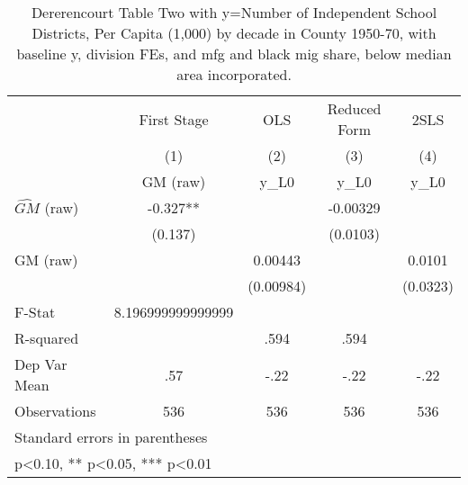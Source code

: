 \begin{table}[htbp]\centering
\def\sym#1{\ifmmode^{#1}\else\(^{#1}\)\fi}
\caption{Dererencourt Table Two with y=Number of Independent School Districts, Per Capita (1,000) by decade in County 1950-70, with baseline y, division FEs, and mfg and black mig share, below median area incorporated.}
\begin{tabular}{l*{4}{c}}
\toprule
                    & First Stage   &         OLS   &Reduced Form   &        2SLS   \\
                    &\multicolumn{1}{c}{(1)}&\multicolumn{1}{c}{(2)}&\multicolumn{1}{c}{(3)}&\multicolumn{1}{c}{(4)}\\
                    &\multicolumn{1}{c}{GM  (raw)}&\multicolumn{1}{c}{y\_L0}&\multicolumn{1}{c}{y\_L0}&\multicolumn{1}{c}{y\_L0}\\
\midrule
$\hat{GM}$ (raw)    &      -0.327** &               &    -0.00329   &               \\
                    &     (0.137)   &               &    (0.0103)   &               \\
\addlinespace
GM  (raw)           &               &     0.00443   &               &      0.0101   \\
                    &               &   (0.00984)   &               &    (0.0323)   \\
\midrule
F-Stat              &8.196999999999999   &               &               &               \\
R-squared           &               &        .594   &        .594   &               \\
Dep Var Mean        &         .57   &        -.22   &        -.22   &        -.22   \\
Observations        &         536   &         536   &         536   &         536   \\
\bottomrule
\multicolumn{5}{l}{\footnotesize Standard errors in parentheses}\\
\multicolumn{5}{l}{\footnotesize * p<0.10, ** p<0.05, *** p<0.01}\\
\end{tabular}
\end{table}
